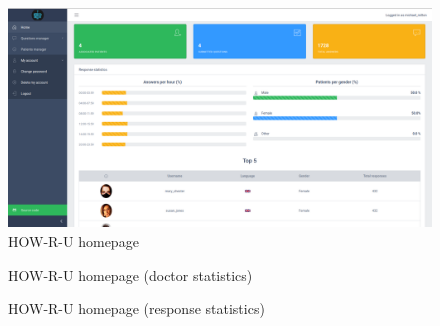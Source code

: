 \documentclass[12pt,english]{article}
\begin{document}
\begin{figure}[H]
    \centering
    \includegraphics[width=\textwidth]{homepage.png}
    \caption{HOW-R-U homepage}
\end{figure}

\begin{figure}[H]
    \caption{HOW-R-U homepage (doctor statistics)}
\end{figure}


\begin{figure}[H]
    \caption{HOW-R-U homepage (response statistics)}
\end{figure}
\end{document}

